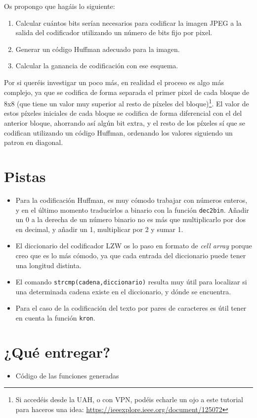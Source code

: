 \documentclass[es,practica]{uah}
\begin{document}
\begin{enumerate}
Os propongo que hagáis lo siguiente:

\begin{enumerate}
	\item Calcular cuántos bits serían necesarios para codificar la imagen JPEG a la salida del codificador utilizando un número de bits fijo por pixel. 
	\item Generar un código Huffman adecuado para la imagen.
	\item Calcular la ganancia de codificación con ese esquema.
\end{enumerate}

Por si queréis investigar un poco más, en realidad el proceso es algo más complejo, ya que se codifica de forma separada el primer pixel de cada bloque de 8x8 (que tiene un valor muy superior al resto de píxeles del bloque)\footnote{Si accedéis desde la UAH, o con VPN, podéis echarle un ojo a este tutorial para haceros una idea: \url{https://ieeexplore.ieee.org/document/125072}}. El valor de estos píxeles iniciales de cada bloque se codifica de forma diferencial con el del anterior bloque, ahorrando así algún bit extra, y el resto de los píxeles sí que se codifican utilizando un código Huffman, ordenando los valores siguiendo un patron en diagonal.


\section{Pistas}
\begin{itemize}
	\item Para la codificación Huffman, es muy cómodo trabajar con números enteros, y en el último momento traducirlos a binario con la función \texttt{dec2bin}. Añadir un 0 a la derecha de un número binario no es más que multiplicarlo por dos en decimal, y añadir un 1, multiplicar por 2 y sumar 1.
	\item El diccionario del codificador LZW os lo paso en formato de \emph{cell array} porque creo que es lo más cómodo, ya que cada entrada del diccionario puede tener una longitud distinta.
	\item El comando \texttt{strcmp(cadena,diccionario)} resulta muy útil para localizar si una determinada cadena existe en el diccionario, y dónde se encuentra.
	\item Para el caso de la codificación del texto por pares de caracteres es útil tener en cuenta la función \texttt{kron}.
\end{itemize}

\section{¿Qué entregar?}
\begin{itemize}
	\item Código de las funciones generadas
\end{itemize}


\end{enumerate}
\end{document}
